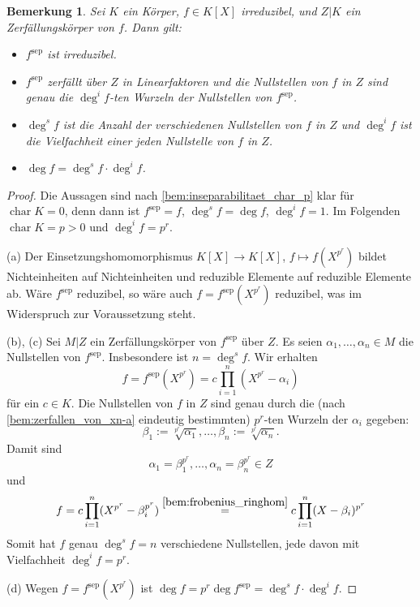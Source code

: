 \documentclass[a4paper, twoside, 11pt, ngerman]{report}
\DeclareMathOperator{\charact}{char}
\DeclareMathOperator{\sep}{sep}
\theoremstyle{definistyle}
\newtheorem{bem}[satz]{Bemerkung}
\theoremstyle{remark}
\begin{document}
\begin{bem}\label{bem:zerfall_separabel}
Sei $K$ ein Körper, $f \in K[X]$ irreduzibel, und $Z|K$ ein Zerfällungskörper von $f$. Dann gilt:
\begin{itemize}
    \item[(a)] $f^{\sep}$ ist irreduzibel.
    \item[(b)] $f^{\sep}$ zerfällt über $Z$ in Linearfaktoren und die Nullstellen von $f$ in $Z$ sind genau die $\deg^i f$-ten Wurzeln der Nullstellen von $f^{\sep}$.
    \item[(c)] $\deg^s f$ ist die Anzahl der verschiedenen Nullstellen von $f$ in $Z$ und $\deg^i f$ ist die Vielfachheit einer jeden Nullstelle von $f$ in $Z$.
    \item[(d)] $\deg f = \deg^s f \cdot \deg^i f$.
\end{itemize}
\end{bem}

\begin{proof}
Die Aussagen sind nach \ref{bem:inseparabilitaet_char_p} klar für $\charact K = 0$, denn dann ist $f^{\sep}=f$,
$\deg^s f=\deg f$, $\deg^i f = 1$. Im Folgenden $\charact K = p > 0$ und $\deg^i f = p^r$.

(a) Der Einsetzungshomomorphismus $K[X] \to K[X]$, $f \mapsto f(X^{p^r})$ bildet Nichteinheiten auf Nichteinheiten und reduzible Elemente auf reduzible Elemente ab. Wäre $f^{\sep}$ reduzibel, so wäre auch $f=f^{\sep}(X^{p^r})$ reduzibel, was im Widerspruch zur Voraussetzung steht.

(b), (c) Sei $M|Z$ ein Zerfällungskörper von $f^{\sep}$ über $Z$. 
Es seien $\alpha_1,\ldots,\alpha_n\in M$ die Nullstellen von $f^{\sep}$. Insbesondere ist $n=\deg^s f$.
Wir erhalten
\[
f = f^{\sep}(X^{p^r}) = c \prod_{i=1}^n (X^{p^r} - \alpha_i)
\]
für ein $c\in K$. Die Nullstellen von $f$ in $Z$ sind genau durch die (nach \ref{bem:zerfallen_von_xn-a} eindeutig bestimmten) $p^r$-ten Wurzeln der $\alpha_i$ gegeben:
\[
\beta_1 := \sqrt[p^r]{\alpha_1}, \ldots, \beta_n:=\sqrt[p^r]{\alpha_n}.
\]
Damit sind
\[
\alpha_1=\beta_1^{p^r},\ldots,\alpha_n=\beta_n^{p^r}\in Z
\]
und
\[
f=c\prod_{i=1}^n (X^{p^r} - \beta_i^{p^r})\overset{\ref{bem:frobenius_ringhom}}{=}c\prod_{i=1}^n (X - \beta_i)^{p^r}
\]
Somit hat $f$ genau $\deg^s f = n$ verschiedene Nullstellen, jede davon mit Vielfachheit $\deg^i f = p^r$.

(d) Wegen $f=f^{\sep}(X^{p^r})$ ist $\deg f = p^r \deg f^{\sep} = \deg^s f \cdot \deg^i f$.
\end{proof}
\end{document}

